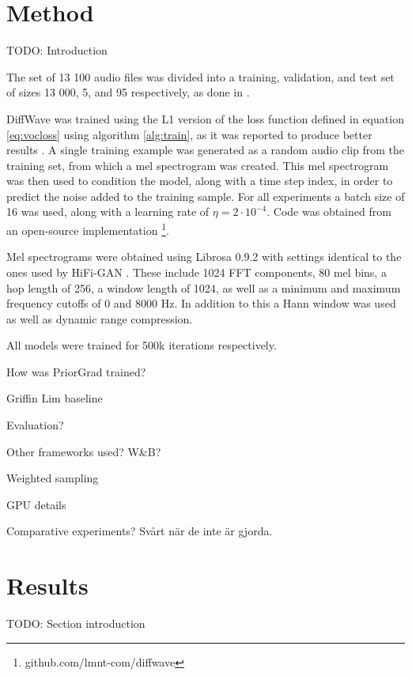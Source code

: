 \documentclass{article}
\begin{document}
\newpage
\section{Method}

TODO: Introduction

The set of 13 100 audio files was divided into a training, validation, and test set of sizes 13 000, 5, and 95 respectively, as done in \cite{lee2021priorgrad}.

DiffWave was trained using the L1 version of the loss function defined in equation \ref{eq:vocloss} using algorithm \ref{alg:train}, as it was reported to produce better results \cite{chen2020wavegrad}. A single training example was generated as a random audio clip from the training set, from which a mel spectrogram was created. This mel spectrogram was then used to condition the model, along with a time step index, in order to predict the noise added to the training sample. For all experiments a batch size of 16 was used, along with a learning rate of $\eta = 2 \cdot 10^{-4}$. Code was obtained from an open-source implementation \footnote{github.com/lmnt-com/diffwave}.

Mel spectrograms were obtained using Librosa 0.9.2 with settings identical to the ones used by HiFi-GAN \cite{kong2020hifi}. These include 1024 FFT components, 80 mel bins, a hop length of 256, a window length of 1024, as well as a minimum and maximum frequency cutoffs of 0 and 8000 Hz. In addition to this a Hann window was used as well as dynamic range compression. 

All models were trained for 500k iterations respectively.

How was PriorGrad trained?

Griffin Lim baseline

Evaluation?

Other frameworks used? W\&B?

Weighted sampling

GPU details

Comparative experiments? Svårt när de inte är gjorda.



\newpage
\section{Results}
TODO: Section introduction
\end{document}
